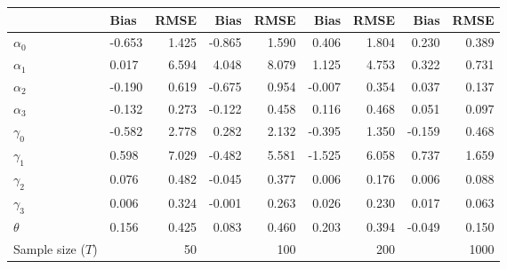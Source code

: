 
\begin{tabular}[t]{llrrrrrrr}
\toprule
  & Bias & RMSE & Bias & RMSE & Bias & RMSE & Bias & RMSE\\
\midrule
$\alpha_{0}$ & -0.653 & 1.425 & -0.865 & 1.590 & 0.406 & 1.804 & 0.230 & 0.389\\
$\alpha_{1}$ & 0.017 & 6.594 & 4.048 & 8.079 & 1.125 & 4.753 & 0.322 & 0.731\\
$\alpha_{2}$ & -0.190 & 0.619 & -0.675 & 0.954 & -0.007 & 0.354 & 0.037 & 0.137\\
$\alpha_{3}$ & -0.132 & 0.273 & -0.122 & 0.458 & 0.116 & 0.468 & 0.051 & 0.097\\
$\gamma_{0}$ & -0.582 & 2.778 & 0.282 & 2.132 & -0.395 & 1.350 & -0.159 & 0.468\\
$\gamma_{1}$ & 0.598 & 7.029 & -0.482 & 5.581 & -1.525 & 6.058 & 0.737 & 1.659\\
$\gamma_{2}$ & 0.076 & 0.482 & -0.045 & 0.377 & 0.006 & 0.176 & 0.006 & 0.088\\
$\gamma_{3}$ & 0.006 & 0.324 & -0.001 & 0.263 & 0.026 & 0.230 & 0.017 & 0.063\\
$\theta$ & 0.156 & 0.425 & 0.083 & 0.460 & 0.203 & 0.394 & -0.049 & 0.150\\
Sample size ($T$) &  & 50 &  & 100 &  & 200 &  & 1000\\
\bottomrule
\end{tabular}
